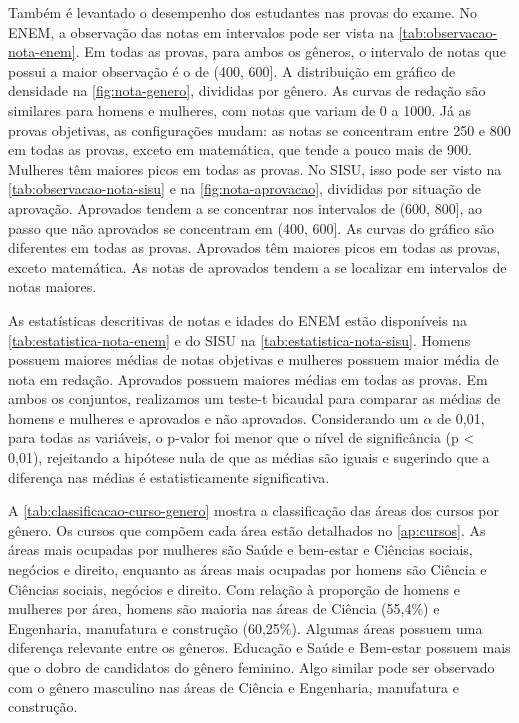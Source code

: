 Também é levantado o desempenho dos estudantes nas provas do exame. No ENEM, a observação das notas em intervalos pode ser vista na \autoref{tab:observacao-nota-enem}. Em todas as provas, para ambos os gêneros, o intervalo de notas que possui a maior observação é o de (400, 600]. A distribuição em gráfico de densidade na \autoref{fig:nota-genero}, divididas por gênero. As curvas de redação são similares para homens e mulheres, com notas que variam de 0 a 1000. Já as provas objetivas, as configurações mudam: as notas se concentram entre 250 e 800 em todas as provas, exceto em matemática, que tende a pouco mais de 900. Mulheres têm maiores picos em todas as provas. No SISU, isso pode ser visto na \autoref{tab:observacao-nota-sisu} e na \autoref{fig:nota-aprovacao}, divididas por situação de aprovação. Aprovados tendem a se concentrar nos intervalos de (600, 800], ao passo que não aprovados se concentram em (400, 600]. As curvas do gráfico são diferentes em todas as provas. Aprovados têm maiores picos em todas as provas, exceto matemática. As notas de aprovados tendem a se localizar em intervalos de notas maiores.

As estatísticas descritivas de notas e idades do ENEM estão disponíveis na \autoref{tab:estatistica-nota-enem} e do SISU na \autoref{tab:estatistica-nota-sisu}. Homens possuem maiores médias de notas objetivas e mulheres possuem maior média de nota em redação. Aprovados possuem maiores médias em todas as provas. Em ambos os conjuntos, realizamos um teste-t bicaudal para comparar as médias de homens e mulheres e aprovados e não aprovados. Considerando um $\alpha$ de 0,01, para todas as variáveis, o p-valor foi menor que o nível de significância (p < 0,01), rejeitando a hipótese nula de que as médias são iguais e sugerindo que a diferença nas médias é estatisticamente significativa.

A \autoref{tab:classificacao-curso-genero} mostra a classificação das áreas dos cursos por gênero. Os cursos que compõem cada área estão detalhados no \autoref{ap:cursos}. As áreas mais ocupadas por mulheres são Saúde e bem-estar e Ciências sociais, negócios e direito, enquanto as áreas mais ocupadas por homens são Ciência e Ciências sociais, negócios e direito. Com relação à proporção de homens e mulheres por área, homens são maioria nas áreas de Ciência (55,4\%) e Engenharia, manufatura e construção (60,25\%). Algumas áreas possuem uma diferença relevante entre os gêneros. Educação e Saúde e Bem-estar possuem mais que o dobro de candidatos do gênero feminino. Algo similar pode ser observado com o gênero masculino nas áreas de Ciência e Engenharia, manufatura e construção.


